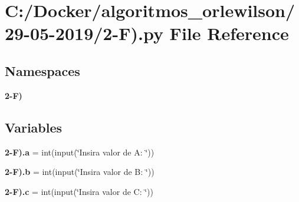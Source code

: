 \section{C\+:/\+Docker/algoritmos\+\_\+orlewilson/29-\/05-\/2019/2-\/F).py File Reference}
\label{2-_f_08_8py}
\subsection*{Namespaces}
\begin{DoxyCompactItemize}
\item 
 \textbf{ 2-\/\+F)}
\end{DoxyCompactItemize}
\subsection*{Variables}
\begin{DoxyCompactItemize}
\item 
\textbf{ 2-\/\+F).\+a} = int(input(\char`\"{}Insira valor de A\+: \char`\"{}))
\item 
\textbf{ 2-\/\+F).\+b} = int(input(\char`\"{}Insira valor de B\+: \char`\"{}))
\item 
\textbf{ 2-\/\+F).\+c} = int(input(\char`\"{}Insira valor de C\+: \char`\"{}))
\end{DoxyCompactItemize}
